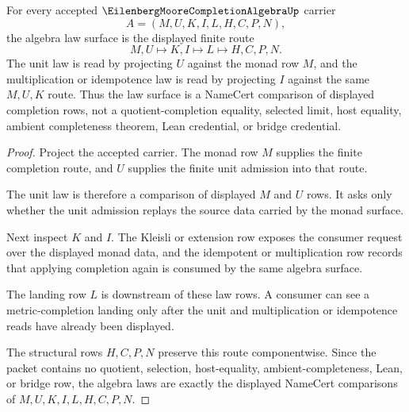 \begin{theorem}
\label{thm:eilenberg-moore-completion-algebra-law-surface}
For every accepted $\EilenbergMooreCompletionAlgebraUp$ carrier
$$
A=(M,U,K,I,L,H,C,P,N),
$$
the algebra law surface is the displayed finite route
$$
M,U \longmapsto K,I \longmapsto L \longmapsto H,C,P,N .
$$
The unit law is read by projecting $U$ against the monad row $M$, and the multiplication or idempotence law is read by projecting $I$ against the same $M,U,K$ route. Thus the law surface is a NameCert comparison of displayed completion rows, not a quotient-completion equality, selected limit, host equality, ambient completeness theorem, Lean credential, or bridge credential.
\end{theorem}
\begin{proof}
Project the accepted carrier. The monad row $M$ supplies the finite completion route, and $U$ supplies the finite unit admission into that route.

The unit law is therefore a comparison of displayed $M$ and $U$ rows. It asks only whether the unit admission replays the source data carried by the monad surface.

Next inspect $K$ and $I$. The Kleisli or extension row exposes the consumer request over the displayed monad data, and the idempotent or multiplication row records that applying completion again is consumed by the same algebra surface.

The landing row $L$ is downstream of these law rows. A consumer can see a metric-completion landing only after the unit and multiplication or idempotence reads have already been displayed.

The structural rows $H,C,P,N$ preserve this route componentwise. Since the packet contains no quotient, selection, host-equality, ambient-completeness, Lean, or bridge row, the algebra laws are exactly the displayed NameCert comparisons of $M,U,K,I,L,H,C,P,N$.
\end{proof}


